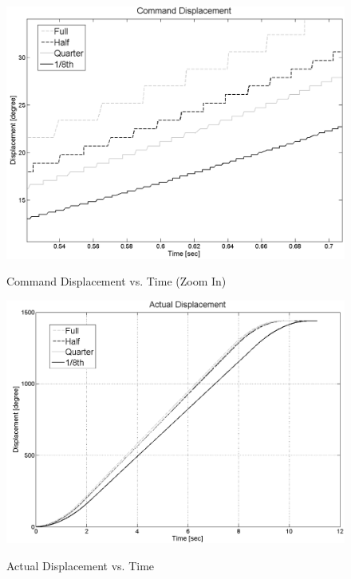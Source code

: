 \documentclass{article}
\theoremstyle{plain}
\theoremstyle{definition}
\theoremstyle{remark}
\begin{document}
\begin{figure}[hbt]
\begin{center}
\includegraphics[width=12cm]{Q4_CommandPosition_L.png}
\caption{Command Displacement vs. Time (Zoom In)} \label{tex}
\label{fig:q4_8}
\end{center}
\end{figure}

\begin{figure}[h]
\begin{center}
\includegraphics[width=12cm]{Q4_ActualPosition.png}
\caption{Actual Displacement vs. Time} \label{tex}
\label{fig:q4_9}
\end{center}
\end{figure}
\end{document}
